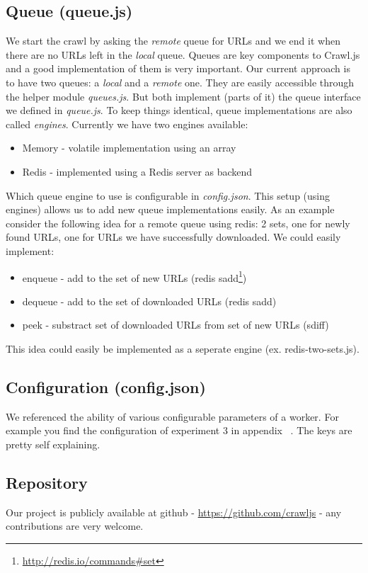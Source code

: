 \subsection{Queue (queue.js)}
We start the crawl by asking the \emph{remote} queue for URLs and we end it when there are no URLs left in the \emph{local} queue. Queues are key components to Crawl.js and a good implementation of them is very important. Our current approach is to have two queues: a \emph{local} and a \emph{remote} one. They are easily accessible through the helper module \emph{queues.js}. But both implement (parts of it) the queue interface we defined in \emph{queue.js}. To keep things identical, queue implementations are also called \emph{engines}. Currently we have two engines available:
\begin{itemize}
  \item Memory - volatile implementation using an array
  \item Redis - implemented using a Redis server as backend
\end{itemize}
Which queue engine to use is configurable in \emph{config.json}. This setup (using engines) allows us to add new queue implementations easily. As an example consider the following idea for a remote queue using redis: 2 sets, one for newly found URLs, one for URLs we have successfully downloaded. We could easily implement:
\begin{itemize}
  \item enqueue - add to the set of new URLs (redis sadd\footnote{\url{http://redis.io/commands\#set}})
  \item dequeue - add to the set of downloaded URLs (redis sadd)
  \item peek - substract set of downloaded URLs from set of new URLs (sdiff)
\end{itemize}
This idea could easily be implemented as a seperate engine (ex. redis-two-sets.js).

\subsection{Configuration (config.json)}
We referenced the ability of various configurable parameters of a worker. For example you find the configuration of experiment 3 in appendix ~. The keys are pretty self explaining.

\subsection{Repository}
Our project is publicly available at github - \url{https://github.com/crawljs} - any contributions are very welcome.
